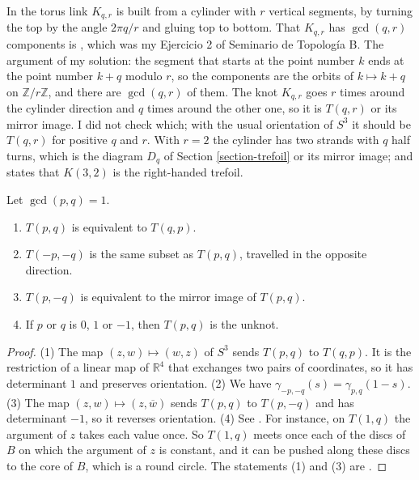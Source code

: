 \begin{remark}
\label{remark-murasugi-torus-notation}
In
\cite[Chapter 7, Section 1]{murasugi}
the torus link $K_{q,r}$ is built from
a cylinder with $r$ vertical segments,
by turning the top by the angle
$2\pi q/r$ and gluing top to bottom.
That $K_{q,r}$ has $\gcd(q,r)$
components is
\cite[Exercise 7.1.1]{murasugi}, which
was my Ejercicio 2 of Seminario de
Topolog\'ia B. The argument of my
solution: the segment that starts at
the point number $k$ ends at the point
number $k+q$ modulo $r$, so the
components are the orbits of
$k\mapsto k+q$ on
$\mathbb{Z}/r\mathbb{Z}$, and there are
$\gcd(q,r)$ of them. The knot $K_{q,r}$
goes $r$ times around the cylinder
direction and $q$ times around the
other one, so it is $T(q,r)$ or its
mirror image. I did not check which;
with the usual orientation of $S^3$ it
should be $T(q,r)$ for positive $q$ and
$r$. With $r=2$ the cylinder has two
strands with $q$ half turns, which is
the diagram $D_q$ of
Section \ref{section-trefoil} or its
mirror image; and
\cite[Example 7.1.1]{murasugi} states
that $K(3,2)$ is the right-handed
trefoil.
\end{remark}

\begin{theorem}
\label{theorem-torus-symmetry}
Let $\gcd(p,q)=1$.
\begin{enumerate}
\item $T(p,q)$ is equivalent to
$T(q,p)$.
\item $T(-p,-q)$ is the same subset as
$T(p,q)$, travelled in the opposite
direction.
\item $T(p,-q)$ is equivalent to the
mirror image of $T(p,q)$.
\item If $p$ or $q$ is $0$, $1$ or
$-1$, then $T(p,q)$ is the unknot.
\end{enumerate}
\end{theorem}

\begin{proof}
(1) The map $(z,w)\mapsto(w,z)$ of
$S^3$ sends $T(p,q)$ to $T(q,p)$. It is
the restriction of a linear map of
$\mathbb{R}^4$ that exchanges two pairs
of coordinates, so it has determinant
$1$ and preserves orientation.
(2) We have
$\gamma_{-p,-q}(s)=\gamma_{p,q}(1-s)$.
(3) The map
$(z,w)\mapsto(z,\overline{w})$ sends
$T(p,q)$ to $T(p,-q)$ and has
determinant $-1$, so it reverses
orientation.
(4) See
\cite[Proposition 7.2.1]{murasugi}. For
instance, on $T(1,q)$ the argument of
$z$ takes each value once. So $T(1,q)$
meets once each of the discs of $B$ on
which the argument of $z$ is constant,
and it can be pushed along these discs
to the core of $B$, which is a round
circle.
The statements (1) and (3) are
\cite[Theorem 7.2.4 and
Proposition 7.2.1]{murasugi}.
\end{proof}

